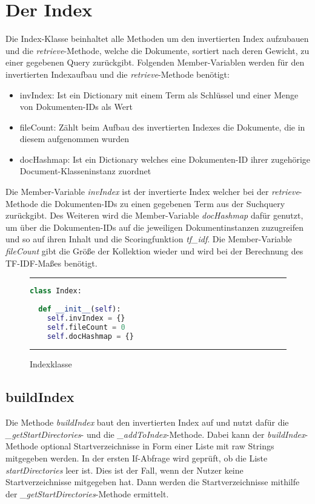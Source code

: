\section{Der Index}\label{der-index}

Die Index-Klasse beinhaltet alle Methoden um den invertierten Index aufzubauen und die \textit{retrieve}-Methode, welche die Dokumente, sortiert nach deren Gewicht, zu einer gegebenen Query zurückgibt. Folgenden Member-Variablen werden für den invertierten Indexaufbau und die \textit{retrieve}-Methode benötigt:

\begin{itemize}
	\item invIndex: Ist ein Dictionary mit einem Term als Schlüssel und einer Menge von Dokumenten-IDs als Wert
	\item fileCount: Zählt beim Aufbau des invertierten Indexes die Dokumente, die in diesem aufgenommen wurden
	\item docHashmap: Ist ein Dictionary welches eine Dokumenten-ID ihrer zugehörige Document-Klasseninstanz zuordnet
\end{itemize}

Die Member-Variable \textit{invIndex} ist der invertierte Index welcher bei der \textit{retrieve}-Methode die Dokumenten-IDs zu einen gegebenen Term aus der Suchquery zurückgibt. Des Weiteren wird die Member-Variable \textit{docHashmap} dafür genutzt, um über die Dokumenten-IDs auf die jeweiligen Dokumentinstanzen zuzugreifen und so auf ihren Inhalt und die Scoringfunktion \textit{tf\_idf}. Die Member-Variable \textit{fileCount} gibt die Größe der Kollektion wieder und wird bei der Berechnung des TF-IDF-Maßes benötigt.

\begin{figure}
	\rule{\textwidth}{0.4pt}
		\begin{lstlisting}[language=Python]
class Index:
  
  def __init__(self):
    self.invIndex = {}
    self.fileCount = 0
    self.docHashmap = {}
		\end{lstlisting}
	\rule{\textwidth}{0.4pt}
	\caption{Indexklasse}
	\label{fig:index}
\end{figure}

\subsection{buildIndex}\label{buildindex}

Die Methode \emph{buildIndex} baut den invertierten Index auf und nutzt dafür die\\
\textit{\_getStartDirectories}- und die \textit{\_addToIndex}-Methode. Dabei kann der \textit{buildIndex}-Methode optional Startverzeichnisse in Form einer Liste mit raw Strings mitgegeben werden. In der ersten If-Abfrage wird geprüft, ob die Liste \textit{startDirectories} leer ist. Dies ist der Fall, wenn der Nutzer keine Startverzeichnisse mitgegeben hat. Dann werden die Startverzeichnisse mithilfe der \textit{\_getStartDirectories}-Methode ermittelt.

